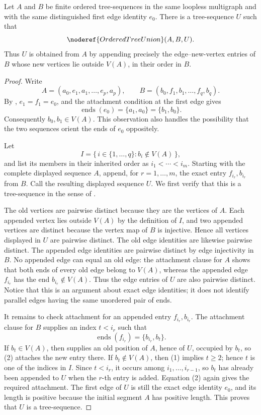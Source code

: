 \begin{lemma}
Let $A$ and $B$ be finite ordered tree-sequences in the same loopless
multigraph and with the same distinguished first edge identity $e_0$.
There is a tree-sequence $U$ such that
\[
                         \noderef{OrderedTreeUnion}(A,B,U).
\]
Thus $U$ is obtained from $A$ by appending precisely the edge--new-vertex
entries of $B$ whose new vertices lie outside $V(A)$, in their order in
$B$.
\end{lemma}
\begin{proof}
Write
\[
 A=(a_0,e_1,a_1,\ldots,e_p,a_p),\qquad
 B=(b_0,f_1,b_1,\ldots,f_q,b_q).
\]
By , $e_1=f_1=e_0$, and the attachment condition at
the first edge gives
\[
       \operatorname{ends}(e_0)=\{a_1,a_0\}=\{b_1,b_0\}.       \tag{1}
\]
Consequently $b_0,b_1\in V(A)$.  This observation also handles the
possibility that the two sequences orient the ends of $e_0$ oppositely.

Let
\[
 I=\{\,i\in\{1,\ldots,q\}:b_i\notin V(A)\,\},
\]
and list its members in their inherited order as
$i_1<\cdots<i_m$.  Starting with the complete displayed sequence $A$,
append, for $r=1,\ldots,m$, the exact entry $f_{i_r},b_{i_r}$ from $B$.
Call the resulting displayed sequence $U$.  We first verify that this is
a tree-sequence in the sense of .

The old vertices are pairwise distinct because they are the vertices of
$A$.  Each appended vertex lies outside $V(A)$ by the definition of $I$,
and two appended vertices are distinct because the vertex map of $B$ is
injective.  Hence all vertices displayed in $U$ are pairwise distinct.
The old edge identities are likewise pairwise distinct.  The appended
edge identities are pairwise distinct by edge injectivity in $B$.  No
appended edge can equal an old edge: the attachment clause for $A$ shows
that both ends of every old edge belong to $V(A)$, whereas the appended
edge $f_{i_r}$ has the end $b_{i_r}\notin V(A)$.  Thus the edge entries of
$U$ are also pairwise distinct.  Notice that this is an argument about
exact edge identities; it does not identify parallel edges having the
same unordered pair of ends.

It remains to check attachment for an appended entry $f_{i_r},b_{i_r}$.
The attachment clause for $B$ supplies an index $t<i_r$ such that
\[
                  \operatorname{ends}(f_{i_r})
                    =\{b_{i_r},b_t\}.                           \tag{2}
\]
If $b_t\in V(A)$, then  supplies an old
position of $A$, hence of $U$, occupied by $b_t$, so (2) attaches the new
entry there.
If $b_t\notin V(A)$, then (1) implies $t\geq2$; hence $t$ is one of the
indices in $I$.  Since $t<i_r$, it occurs among
$i_1,\ldots,i_{r-1}$, so $b_t$ has already been appended to $U$ when the
$r$-th entry is added.  Equation (2) again gives the required attachment.
The first edge of $U$ is still the exact edge identity $e_0$, and its
length is positive because the initial segment $A$ has positive length.
This proves that $U$ is a tree-sequence.


\end{proof}
